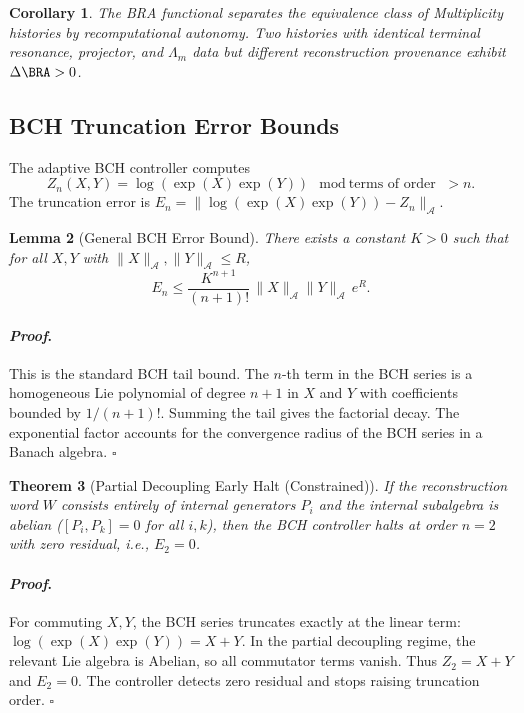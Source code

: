 \documentclass[12pt]{article}
\theoremstyle{plain}
\newtheorem{theorem}{Theorem}[section]
\newtheorem{lemma}[theorem]{Lemma}
\newtheorem{corollary}[theorem]{Corollary}
\theoremstyle{definition}
\theoremstyle{remark}
\renewenvironment{proof}{\paragraph{\textit{Proof}.}}{\hfill$\square$}
\begin{document}
\begin{corollary}
The BRA functional separates the equivalence class of Multiplicity histories by recomputational autonomy. Two histories with identical terminal resonance, projector, and $\Lambda_m$ data but different reconstruction provenance exhibit $\Delta \BRA > 0$.
\end{corollary}

\subsection{BCH Truncation Error Bounds}

The adaptive BCH controller computes
\[
Z_n(X,Y) = \log(\exp(X)\exp(Y)) \mod \text{terms of order } > n.
\]
The truncation error is $E_n = \|\log(\exp(X)\exp(Y)) - Z_n\|_{\mathcal{A}}$.

\begin{lemma}[General BCH Error Bound]
\label{lem:bch-error}
There exists a constant $K > 0$ such that for all $X,Y$ with $\|X\|_{\mathcal{A}}, \|Y\|_{\mathcal{A}} \le R$,
\[
E_n \le \frac{K^{n+1}}{(n+1)!} \, \|X\|_{\mathcal{A}} \|Y\|_{\mathcal{A}} \, e^{R}.
\]
\end{lemma}

\begin{proof}
This is the standard BCH tail bound. The $n$-th term in the BCH series is a homogeneous Lie polynomial of degree $n+1$ in $X$ and $Y$ with coefficients bounded by $1/(n+1)!$. Summing the tail gives the factorial decay. The exponential factor accounts for the convergence radius of the BCH series in a Banach algebra.
\end{proof}

\begin{theorem}[Partial Decoupling Early Halt (Constrained)]
\statuslean
If the reconstruction word $W$ consists entirely of internal generators $P_i$ and the internal subalgebra is abelian ($[P_i, P_k] = 0$ for all $i,k$), then the BCH controller halts at order $n=2$ with zero residual, i.e., $E_2 = 0$.
\end{theorem}

\begin{proof}
For commuting $X,Y$, the BCH series truncates exactly at the linear term: $\log(\exp(X)\exp(Y)) = X+Y$. In the partial decoupling regime, the relevant Lie algebra is Abelian, so all commutator terms vanish. Thus $Z_2 = X+Y$ and $E_2 = 0$. The controller detects zero residual and stops raising truncation order.
\end{proof}
\end{document}
